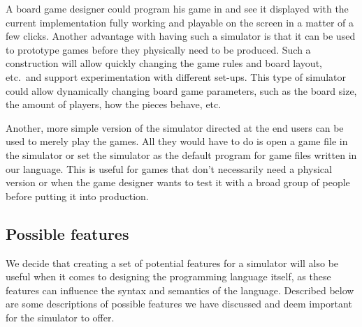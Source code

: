 A board game designer could program his game in \productname{} and see it
displayed with the current implementation fully working and playable on the
screen in a matter of a few clicks. Another advantage with having such a
simulator is that it can be used to prototype games before they physically need
to be produced. Such a construction will allow quickly changing the game rules
and board layout, etc.\ and support experimentation with different set-ups. This
type of simulator could allow dynamically changing board game parameters, such
as the board size, the amount of players, how the pieces behave, etc.

Another, more simple version of the simulator directed at the end users can be
used to merely play the games. All they would have to do is open a game file in
the simulator or set the simulator as the default program for game files written
in our language. This is useful for games that don't necessarily need a physical
version or when the game designer wants to test it with a broad group of people
before putting it into production.

\subsection{Possible features}
We decide that creating a set of potential features for a simulator will also be
useful when it comes to designing the programming language itself, as these
features can influence the syntax and semantics of the \productname{} language.
Described below are some descriptions of possible features we have discussed and
deem important for the simulator to offer.

